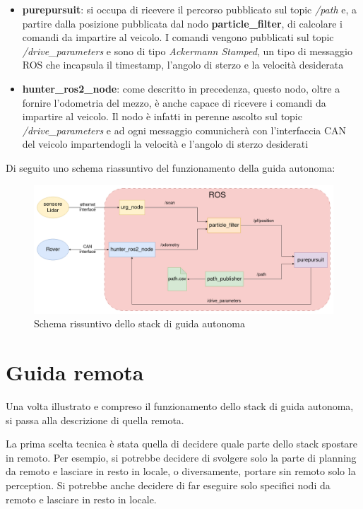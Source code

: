 \begin{itemize}
  \item \textbf{purepursuit}: si occupa di ricevere il percorso pubblicato sul topic \textit{/path} e, a partire dalla posizione pubblicata dal nodo \textbf{particle\_filter}, di calcolare i comandi da impartire al veicolo. I comandi vengono pubblicati sul topic \textit{/drive\_parameters} e sono di tipo \textit{Ackermann Stamped}, un tipo di messaggio ROS che incapsula il timestamp, l'angolo di sterzo e la velocità desiderata
  \item \textbf{hunter\_ros2\_node}: come descritto in precedenza, questo nodo, oltre a fornire l'odometria del mezzo, è anche capace di ricevere i comandi da impartire al veicolo. Il nodo è infatti in perenne ascolto sul topic \textit{/drive\_parameters} e ad ogni messaggio comunicherà con l'interfaccia CAN del veicolo impartendogli la velocità e l'angolo di sterzo desiderati
\end{itemize}

\noindent Di seguito uno schema riassuntivo del funzionamento della guida autonoma:
\begin{figure}[h]
  \centering
  \includegraphics[width=1\textwidth]{figures/schema_guida_autonoma.png}
  \caption{Schema rissuntivo dello stack di guida autonoma}
  \label{Schema rissuntivo dello stack di guida autonoma}
\end{figure}

\section{Guida remota}
Una volta illustrato e compreso il funzionamento dello stack di guida autonoma, si passa alla descrizione di quella remota.

\noindent La prima scelta tecnica è stata quella di decidere quale parte dello stack spostare in remoto. Per esempio, si potrebbe decidere di svolgere solo la parte di planning da remoto e lasciare in resto in locale, o diversamente, portare sin remoto solo la perception. Si potrebbe anche decidere di far eseguire solo specifici nodi da remoto e lasciare in resto in locale.

